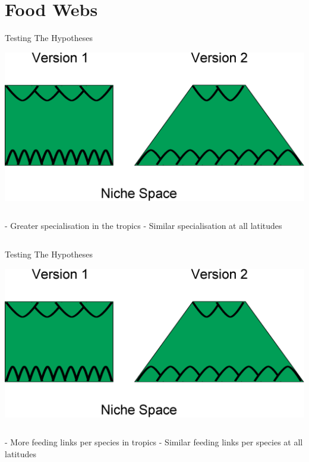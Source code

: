 \documentclass{beamer}
\begin{document}
\section*{Food Webs}
  \begin{frame}{Testing The Hypotheses}

    \begin{center}
      \includegraphics[width=.8\textwidth]{Figures/hypothesis_comparison.eps}

    \end{center}

    \begin{columns}
    \column{1in}
    \column{1in}
      - Greater specialisation in the tropics
    \column{1in}
    \column{1in}
      - Similar specialisation at all latitudes
    \column{1in}
    \end{columns}

  \end{frame}


  \begin{frame}{Testing The Hypotheses}

    \begin{center}
      \includegraphics[width=.8\textwidth]{Figures/hypothesis_comparison.eps}

    \end{center}

    \begin{columns}
    \column{1in}
    \column{1in}
      - More feeding links per species in tropics
    \column{1in}
    \column{1in}
      - Similar feeding links per species at all latitudes
    \column{1in}
    \end{columns}

  \end{frame}
\end{document}
